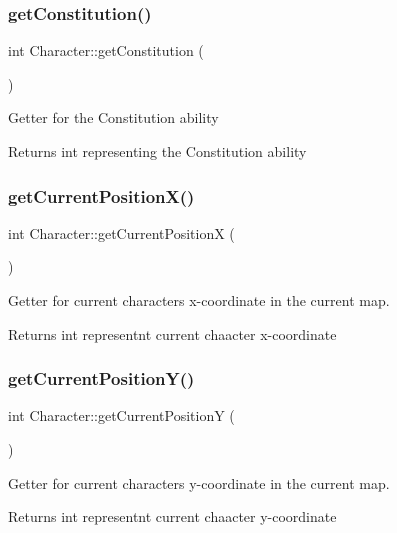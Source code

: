 \subsubsection{\texorpdfstring{get\+Constitution()}{getConstitution()}}
{\footnotesize\ttfamily int Character\+::get\+Constitution (\begin{DoxyParamCaption}{ }\end{DoxyParamCaption})}

Getter for the Constitution ability \begin{DoxyReturn}{Returns}
int representing the Constitution ability 
\end{DoxyReturn}
\hypertarget{classCharacter_ae0a3d4fb5985bf2101292f7a4fc6b9c2}{}\label{classCharacter_ae0a3d4fb5985bf2101292f7a4fc6b9c2} 
\subsubsection{\texorpdfstring{get\+Current\+Position\+X()}{getCurrentPositionX()}}
{\footnotesize\ttfamily int Character\+::get\+Current\+PositionX (\begin{DoxyParamCaption}{ }\end{DoxyParamCaption})}

Getter for current character\textquotesingle{}s x-\/coordinate in the current map. \begin{DoxyReturn}{Returns}
int representnt current chaacter x-\/coordinate 
\end{DoxyReturn}
\hypertarget{classCharacter_aa2b5d86af4a2f086b5f80eac3e209dcc}{}\label{classCharacter_aa2b5d86af4a2f086b5f80eac3e209dcc} 
\subsubsection{\texorpdfstring{get\+Current\+Position\+Y()}{getCurrentPositionY()}}
{\footnotesize\ttfamily int Character\+::get\+Current\+PositionY (\begin{DoxyParamCaption}{ }\end{DoxyParamCaption})}

Getter for current character\textquotesingle{}s y-\/coordinate in the current map. \begin{DoxyReturn}{Returns}
int representnt current chaacter y-\/coordinate 
\end{DoxyReturn}
\hypertarget{classCharacter_a86b9d59f326c3df44a6bf2484fd95a7c}{}\label{classCharacter_a86b9d59f326c3df44a6bf2484fd95a7c} 
